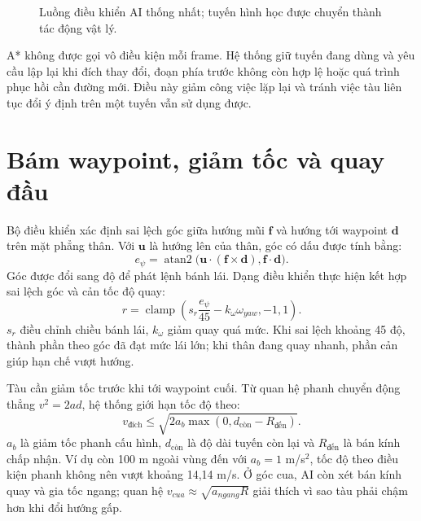 \documentclass[11pt,a4paper,oneside]{report}
\begin{document}
\begin{figure}[H]\centering
{}
\caption{Luồng điều khiển AI thống nhất; tuyến hình học được chuyển thành tác động vật lý.}
\end{figure}

A* không được gọi vô điều kiện mỗi frame. Hệ thống giữ tuyến đang dùng và yêu cầu lập lại khi đích thay đổi, đoạn phía trước không còn hợp lệ hoặc quá trình phục hồi cần đường mới. Điều này giảm công việc lặp lại và tránh việc tàu liên tục đổi ý định trên một tuyến vẫn sử dụng được.

\section{Bám waypoint, giảm tốc và quay đầu}
Bộ điều khiển xác định sai lệch góc giữa hướng mũi $\mathbf f$ và hướng tới waypoint $\mathbf d$ trên mặt phẳng thân. Với $\mathbf u$ là hướng lên của thân, góc có dấu được tính bằng:
\begin{equation}
 e_\psi=\operatorname{atan2}\bigl(\mathbf u\cdot(\mathbf f\times\mathbf d),\mathbf f\cdot\mathbf d\bigr).
\end{equation}
Góc được đổi sang độ để phát lệnh bánh lái. Dạng điều khiển thực hiện kết hợp sai lệch góc và cản tốc độ quay:
\[
 r=\operatorname{clamp}\left(s_r\frac{e_\psi}{45}-k_\omega\omega_{yaw},-1,1\right).
\]
$s_r$ điều chỉnh chiều bánh lái, $k_\omega$ giảm quay quá mức. Khi sai lệch khoảng 45 độ, thành phần theo góc đã đạt mức lái lớn; khi thân đang quay nhanh, phần cản giúp hạn chế vượt hướng.

Tàu cần giảm tốc trước khi tới waypoint cuối. Từ quan hệ phanh chuyển động thẳng $v^2=2ad$, hệ thống giới hạn tốc độ theo:
\begin{equation}
 v_{\text{đích}}\leq\sqrt{2a_b\max(0,d_{\text{còn}}-R_{\text{đến}})}.
\end{equation}
$a_b$ là giảm tốc phanh cấu hình, $d_{\text{còn}}$ là độ dài tuyến còn lại và $R_{\text{đến}}$ là bán kính chấp nhận. Ví dụ còn 100 m ngoài vùng đến với $a_b=1$ m/s$^2$, tốc độ theo điều kiện phanh không nên vượt khoảng 14,14 m/s. Ở góc cua, AI còn xét bán kính quay và gia tốc ngang; quan hệ $v_{cua}\approx\sqrt{a_{ngang}R}$ giải thích vì sao tàu phải chậm hơn khi đổi hướng gấp.
\end{document}
